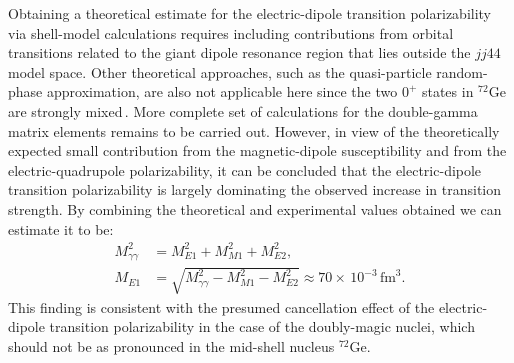 Obtaining a theoretical estimate for the electric-dipole transition polarizability via shell-model calculations requires including contributions from orbital transitions related to the giant dipole resonance region that lies outside the $jj44$ model space. Other theoretical approaches, such as the quasi-particle random-phase approximation, are also not applicable here since the two $0^+$ states in $^{72}\mathrm{Ge}$ are strongly mixed\,\cite{Ayangeakaa-2016}. More complete set of calculations for the double-gamma matrix elements remains to be carried out. However, in view of the theoretically expected small contribution from the magnetic-dipole susceptibility and from the electric-quadrupole polarizability, it can be concluded that the electric-dipole transition polarizability is largely dominating the observed increase in transition strength. By combining the theoretical and experimental values obtained we can estimate it to be:
\begin{align}
    M_{\gamma\gamma}^2 &= M_{E1}^2 + M_{M1}^2 +  M_{E2}^2,\\
    M_{E1} &= \sqrt{M_{\gamma\gamma}^2-M_{M1}^2-M_{E2}^2} \approx 70\times\,10^{-3}\,\mathrm{fm}^{3}.
    \label{eq:chap3:NME_E1}
\end{align}
This finding is consistent with the presumed cancellation effect of the electric-dipole transition polarizability in the case of the doubly-magic nuclei, which should not be as pronounced in the mid-shell nucleus $^{72}\mathrm{Ge}$.


